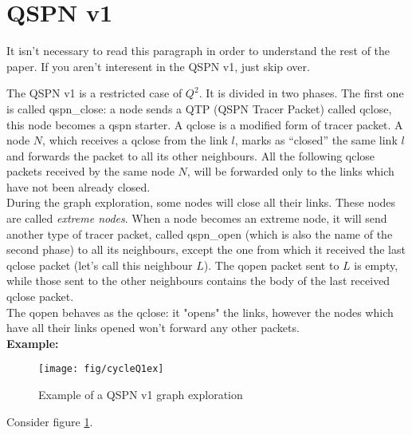 \documentclass[a4paper]{article}
\begin{document}
\section{QSPN v1}
\label{sec:QSPNv1}
\small{It isn't necessary to read this paragraph in order to understand the
rest of the paper. If you aren't interesent in the QSPN v1, just skip over.}

The QSPN v1 is a restricted case of $Q^2$. 
It is divided in two phases.
The first one is called qspn\_close:
a node sends a QTP (QSPN Tracer Packet) called qclose, this node becomes a qspn starter.
A qclose is a modified form of tracer packet.
  A node $N$, which receives a qclose from the link $l$, marks as ``closed'' the
  same link $l$ and forwards the packet to all its other neighbours.
  All the following qclose packets received by the same node $N$, will
  be forwarded only to the links which have not been already closed.\\
  During the graph exploration, some nodes will close all their links.
  These nodes are called \emph{extreme nodes}. When a node becomes an extreme node, 
  it will send another type of tracer packet, called qspn\_open (which is also
  the name of the second phase) to all its neighbours, except the one from
  which it received the last qclose packet (let's call this neighbour $L$).
  The qopen packet sent to $L$ is empty, while those sent to the other
  neighbours contains the body of the last received qclose packet.\\
  The qopen behaves as the qclose: it "opens" the links, however the nodes
  which have all their links opened won't forward any other packets.\\
\textbf{Example: }
  \begin{figure}[h]
  \begin{center}
	  \texttt{[image: fig/cycleQ1ex]}
	  \caption{Example of a QSPN v1 graph exploration}
	  \label{fig:q1ex}
  \end{center}
  \end{figure}
  Consider figure \ref{fig:q1ex}.
\end{document}
